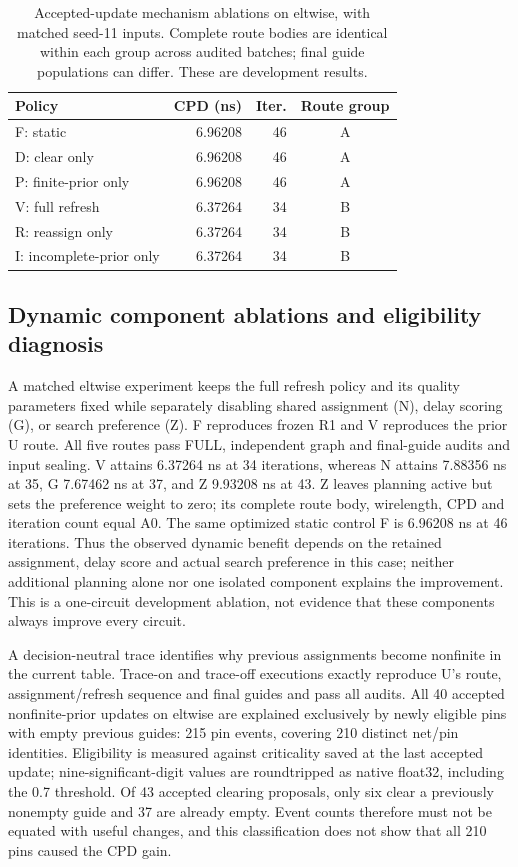 \documentclass[conference,10pt]{IEEEtran}
\begin{document}
\begin{table}[t]
\centering
\caption{Accepted-update mechanism ablations on eltwise, with matched seed-11 inputs. Complete route bodies are identical within each group across audited batches; final guide populations can differ. These are development results.}
\begin{tabular}{lrrc}
\hline
Policy & CPD (ns) & Iter. & Route group\\
\hline
F: static & 6.96208 & 46 & A\\
D: clear only & 6.96208 & 46 & A\\
P: finite-prior only & 6.96208 & 46 & A\\
V: full refresh & 6.37264 & 34 & B\\
R: reassign only & 6.37264 & 34 & B\\
I: incomplete-prior only & 6.37264 & 34 & B\\
\hline
\end{tabular}
\end{table}


\subsection{Dynamic component ablations and eligibility diagnosis}
A matched eltwise experiment keeps the full refresh policy and its quality parameters fixed while separately disabling shared assignment (N), delay scoring (G), or search preference (Z). F reproduces frozen R1 and V reproduces the prior U route. All five routes pass FULL, independent graph and final-guide audits and input sealing. V attains 6.37264 ns at 34 iterations, whereas N attains 7.88356 ns at 35, G 7.67462 ns at 37, and Z 9.93208 ns at 43. Z leaves planning active but sets the preference weight to zero; its complete route body, wirelength, CPD and iteration count equal A0. The same optimized static control F is 6.96208 ns at 46 iterations. Thus the observed dynamic benefit depends on the retained assignment, delay score and actual search preference in this case; neither additional planning alone nor one isolated component explains the improvement. This is a one-circuit development ablation, not evidence that these components always improve every circuit.

A decision-neutral trace identifies why previous assignments become nonfinite in the current table. Trace-on and trace-off executions exactly reproduce U's route, assignment/refresh sequence and final guides and pass all audits. All 40 accepted nonfinite-prior updates on eltwise are explained exclusively by newly eligible pins with empty previous guides: 215 pin events, covering 210 distinct net/pin identities. Eligibility is measured against criticality saved at the last accepted update; nine-significant-digit values are roundtripped as native float32, including the 0.7 threshold. Of 43 accepted clearing proposals, only six clear a previously nonempty guide and 37 are already empty. Event counts therefore must not be equated with useful changes, and this classification does not show that all 210 pins caused the CPD gain.
\end{document}
